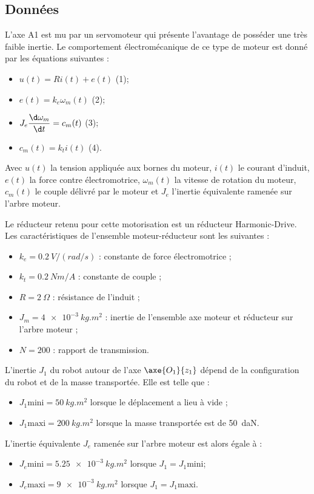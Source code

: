 \subsection{Données} 
L’axe A1 est mu par un servomoteur qui présente l'avantage de posséder une très faible 
inertie. Le comportement électromécanique de ce type de moteur est donné par les équations 
suivantes : 
\begin{itemize}%
\item $u(t) = Ri(t) + e(t)$ (1);
\item $e(t) = k_e \omega_m(t)$  (2);
\item $J_e \dfrac{\d \omega_m}{\d t} = c_m(t)$ (3);
\item $c_m(t) = k_t i(t)$ (4).
\end{itemize}

Avec $u(t)$ la tension appliquée aux bornes du moteur, $i(t)$ le courant d’induit, $e(t)$ la force 
contre électromotrice, $\omega_m(t)$ la vitesse de rotation du moteur, $c_m(t)$ le couple délivré par le 
moteur et $J_e$ l’inertie équivalente ramenée sur l’arbre moteur. 

Le réducteur retenu pour cette motorisation est un réducteur Harmonic-Drive. Les 
caractéristiques de l’ensemble moteur-réducteur sont les suivantes : 
\begin{itemize}
\item $k_e = \SI{0,2}{V/(rad/s)}$ : constante de force électromotrice ; 
\item $k_t = \SI{0,2}{Nm/A}$ : constante de couple ; 
\item $R = \SI{2}{\Omega}$ : résistance de l’induit ; 
\item $J_m = \SI{4e-3}{kg.m^2}$ : inertie de l’ensemble axe moteur et réducteur sur l'arbre moteur ; 
\item $N = 200$ : rapport de transmission. 
\end{itemize}

L’inertie $J_1$ du robot autour de l’axe $\axe{O_1}{z_1}$ dépend de la configuration du robot et de la masse
transportée. Elle est telle que : 
\begin{itemize}
\item $J_1 \text{mini} = \SI{50}{kg.m^2}$  lorsque le déplacement a lieu à vide ; 
\item $J_1 \text{maxi} = \SI{200}{kg.m^2}$  lorsque la masse transportée est de \SI{50}{daN}. 
\end{itemize}
L’inertie équivalente $J_e$ ramenée sur l’arbre moteur est alors égale à : 
\begin{itemize}
\item $J_e \text{mini} = \SI{5,25e-3}{kg.m^2}$  lorsque $J_1 = J_1 \text{mini}$; 
\item $J_e \text{maxi} = \SI{9e-3}{kg.m^2}$  lorsque $J_1 = J_1 \text{maxi}$. 
\end{itemize}

